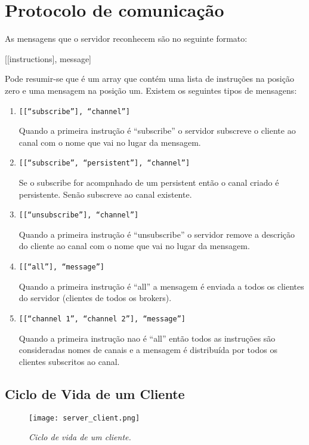 
\section{Protocolo de comunicação}
\label{sec:protocolo}

As mensagens que o servidor reconhecem são no seguinte formato:

[[instructions], message]

Pode resumir-se que é um array que contém uma lista de instruções na posição zero e uma mensagem na posição um. Existem os seguintes tipos de mensagens:

\begin{enumerate}
\item
\texttt{[[``subscribe''], ``channel'']}

Quando a primeira instrução é ``subscribe'' o servidor subscreve o cliente ao canal com o nome que vai no lugar da mensagem.

\item
\texttt{[[``subscribe'', ``persistent''], ``channel'']}

Se o subscribe for acompnhado de um persistent então o canal criado é persistente. Senão subscreve ao canal existente.

\item
\texttt{[[``unsubscribe''], ``channel'']}

Quando a primeira instrução é ``unsubscribe'' o servidor remove a descrição do cliente ao canal com o nome que vai no lugar da mensagem.

\item
\texttt{[[``all''], ``message'']}

Quando a primeira instrução é ``all'' a mensagem é enviada a todos os clientes do servidor (clientes de todos os brokers).

\item
\texttt{[[``channel 1'', ``channel 2''], ``message'']}

Quando a primeira instrução nao é ``all'' então todos as instruções são consideradas nomes de canais e a mensagem é distribuída por todos os clientes subscritos ao canal.

\end{enumerate}

\subsection{Ciclo de Vida de um Cliente}

\begin{figure}[H]
\centering
\texttt{[image: server\_client.png]}
\caption{\textit{Ciclo de vida de um cliente.}}
\label{fig:server-client}
\end{figure}

